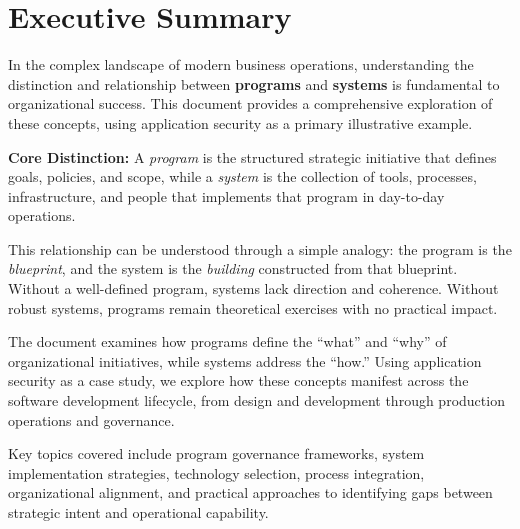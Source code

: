 \documentclass[11pt,letterpaper]{article}
\begin{document}
\tableofcontents
\thispagestyle{empty}
\newpage
\clearpage{}

\section{Executive Summary}

In the complex landscape of modern business operations, understanding the distinction and relationship between \textbf{programs} and \textbf{systems} is fundamental to organizational success. This document provides a comprehensive exploration of these concepts, using application security as a primary illustrative example.

\begin{summarybox}
\textbf{Core Distinction:} A \textit{program} is the structured strategic initiative that defines goals, policies, and scope, while a \textit{system} is the collection of tools, processes, infrastructure, and people that implements that program in day-to-day operations.
\end{summarybox}

This relationship can be understood through a simple analogy: the program is the \textit{blueprint}, and the system is the \textit{building} constructed from that blueprint. Without a well-defined program, systems lack direction and coherence. Without robust systems, programs remain theoretical exercises with no practical impact.

The document examines how programs define the ``what'' and ``why'' of organizational initiatives, while systems address the ``how.'' Using application security as a case study, we explore how these concepts manifest across the software development lifecycle, from design and development through production operations and governance.

Key topics covered include program governance frameworks, system implementation strategies, technology selection, process integration, organizational alignment, and practical approaches to identifying gaps between strategic intent and operational capability.

\end{document}
